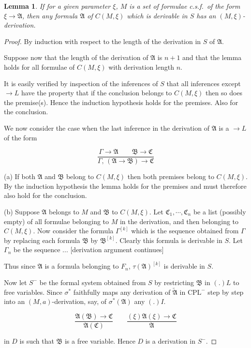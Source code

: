 \documentclass[12pt,a4paper]{article}
\newtheorem{lemma}{Lemma}
\begin{document}
\begin{lemma}
If for a given parameter $\xi$, $M$ is a set of formulae c.s.f.\ of the form
$\xi \to \mathfrak{A}$, then any formula $\mathfrak{A}$ of $C(M, \xi)$ which
is derivable in $S$ has an $(M, \xi)$-derivation.
\end{lemma}

\begin{proof}
By induction with respect to the length of the derivation in $S$ of
$\mathfrak{A}$.

Suppose now that the length of the derivation of $\mathfrak{A}$ is $n+1$ and
that the lemma holds for all formulae of $C(M,\xi)$ with derivation length
$n$.

It is easily verified by inspection of the inferences of $S$ that all
inferences except $\to L$ have the property that if the conclusion belongs to
$C(M,\xi)$ then so does the premise(s). Hence the induction hypothesis holds
for the premises. Also for the conclusion.

We now consider the case when the last inference in the derivation of
$\mathfrak{A}$ is a $\to L$ of the form

\[
\dfrac{\Gamma \to \mathfrak{A}\qquad\mathfrak{B} \to \mathfrak{C}}
      {\Gamma,\,(\mathfrak{A} \to \mathfrak{B}) \to \mathfrak{C}}
\]

(a) If both $\mathfrak{A}$ and $\mathfrak{B}$ belong to $C(M,\xi)$ then both
premises belong to $C(M,\xi)$. By the induction hypothesis the lemma holds for
the premises and must therefore also hold for the conclusion.

(b) Suppose $\mathfrak{A}$ belongs to $M$ and $\mathfrak{B}$ to $C(M,\xi)$.
Let $\mathfrak{C}_1, \cdots, \mathfrak{C}_n$ be a list (possibly empty) of
all formulae belonging to $M$ in the derivation, and then belonging to
$C(M,\xi)$.
Now consider the formula $\Gamma^{[k]}$ which is the sequence obtained from
$\Gamma$ by replacing each formula $\mathfrak{B}$ by $\mathfrak{B}^{[k]}$.
Clearly this formula is derivable in $S$. Let $\Gamma_n$ be the sequence ...
[derivation argument continues]

Thus since $\mathfrak{A}$ is a formula belonging to $F_n$, $\tau(\mathfrak{A})^{[k]}$
is derivable in $S$.

Now let $S^-$ be the formal system obtained from $S$ by restricting
$\mathfrak{B}$ in $(.)L$ to free variables. Since $\sigma^*$ faithfully maps
any derivation of $\tilde{\mathfrak{A}}$ in $\mathrm{CPL}^-$ step by step
into an $(M, a)$-derivation, say, of $\sigma^*(\mathfrak{A})$ any $(.)I$.

\[
\dfrac{\mathfrak{A}(\mathfrak{B}) \to \mathfrak{C}}{\mathfrak{A}(\mathfrak{C})}
\qquad
\dfrac{(\xi)\mathfrak{A}(\xi) \to \mathfrak{C}}{\mathfrak{A}}
\]

in $D$ is such that $\mathfrak{B}$ is a free variable. Hence $D$ is a
derivation in $S^-$.
\end{proof}
\end{document}
